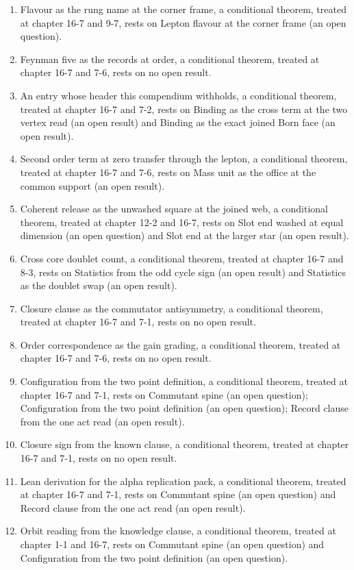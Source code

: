 \begin{enumerate}
\item Flavour as the rung name at the corner frame, a conditional theorem, treated at chapter 16-7 and 9-7, rests on Lepton flavour at the corner frame (an open question).
\item Feynman five as the records at order, a conditional theorem, treated at chapter 16-7 and 7-6, rests on no open result.
\item An entry whose header this compendium withholds, a conditional theorem, treated at chapter 16-7 and 7-2, rests on Binding as the cross term at the two vertex read (an open result) and Binding as the exact joined Born face (an open result).
\item Second order term at zero transfer through the lepton, a conditional theorem, treated at chapter 16-7 and 7-6, rests on Mass unit as the office at the common support (an open result).
\item Coherent release as the unwashed square at the joined web, a conditional theorem, treated at chapter 12-2 and 16-7, rests on Slot end washed at equal dimension (an open question) and Slot end at the larger star (an open result).
\item Cross core doublet count, a conditional theorem, treated at chapter 16-7 and 8-3, rests on Statistics from the odd cycle sign (an open result) and Statistics as the doublet swap (an open result).
\item Closure clause as the commutator antisymmetry, a conditional theorem, treated at chapter 16-7 and 7-1, rests on no open result.
\item Order correspondence as the gain grading, a conditional theorem, treated at chapter 16-7 and 7-6, rests on no open result.
\item Configuration from the two point definition, a conditional theorem, treated at chapter 16-7 and 7-1, rests on Commutant spine (an open question); Configuration from the two point definition (an open question); Record clause from the one act read (an open result).
\item Closure sign from the known clause, a conditional theorem, treated at chapter 16-7 and 7-1, rests on no open result.
\item Lean derivation for the alpha replication pack, a conditional theorem, treated at chapter 16-7 and 7-1, rests on Commutant spine (an open question) and Record clause from the one act read (an open result).
\item Orbit reading from the knowledge clause, a conditional theorem, treated at chapter 1-1 and 16-7, rests on Commutant spine (an open question) and Configuration from the two point definition (an open question).

\end{enumerate}

